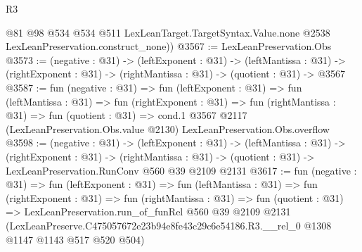 \begin{lexlean}{R3}
\begin{coremodule}
        @81
        @98
        @534
        @534
        @511
        LexLeanTarget.TargetSyntax.Value.none
        @2538
        LexLeanPreservation.construct_none))
@3567 := LexLeanPreservation.Obs
@3573 := (negative : @31) ->
  (leftExponent : @31) ->
  (leftMantissa : @31) ->
  (rightExponent : @31) -> (rightMantissa : @31) -> (quotient : @31) -> @3567
@3587 := fun (negative : @31) =>
  fun (leftExponent : @31) =>
  fun (leftMantissa : @31) =>
  fun (rightExponent : @31) =>
  fun (rightMantissa : @31) =>
  fun (quotient : @31) =>
  cond.{1} @3567 @2117 (LexLeanPreservation.Obs.value @2130) LexLeanPreservation.Obs.overflow
@3598 := (negative : @31) ->
  (leftExponent : @31) ->
  (leftMantissa : @31) ->
  (rightExponent : @31) ->
  (rightMantissa : @31) -> (quotient : @31) -> LexLeanPreservation.RunConv @560 @39 @2109 @2131
@3617 := fun (negative : @31) =>
  fun (leftExponent : @31) =>
  fun (leftMantissa : @31) =>
  fun (rightExponent : @31) =>
  fun (rightMantissa : @31) =>
  fun (quotient : @31) =>
  LexLeanPreservation.run_of_funRel
    @560
    @39
    @2109
    @2131
    (LexLeanPreserve.C475057672e23b94e8fe43c29c6e54186.R3.__rel_0 @1308 @1147 @1143 @517 @520 @504)
\end{coremodule}
\end{lexlean}
